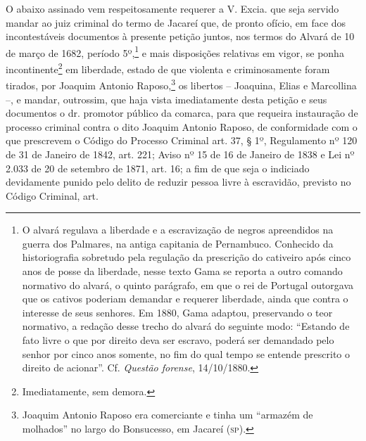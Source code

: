 O abaixo assinado vem respeitosamente requerer a V. Excia. que seja
servido mandar ao juiz criminal do termo de Jacareí que, de pronto
ofício, em face dos incontestáveis documentos à presente petição juntos,
nos termos do Alvará de 10 de março de 1682, período 5º,\footnote{ O
  alvará regulava a liberdade e a escravização de negros apreendidos na
  guerra dos Palmares, na antiga capitania de Pernambuco. Conhecido da
  historiografia sobretudo pela regulação da prescrição do cativeiro
  após cinco anos de posse da liberdade, nesse texto Gama se reporta a
  outro comando normativo do alvará, o quinto parágrafo, em que o rei de
  Portugal outorgava que os cativos poderiam demandar e requerer
  liberdade, ainda que contra o interesse de seus senhores. Em 1880,
  Gama adaptou, preservando o teor normativo, a redação desse trecho do
  alvará do seguinte modo: ``Estando de fato livre o que por direito deva
  ser escravo, poderá ser demandado pelo senhor por cinco anos somente,
  no fim do qual tempo se entende prescrito o direito de acionar''. Cf.
  \emph{Questão forense}, 14/10/1880.} e mais disposições relativas em
vigor, se ponha incontinente\footnote{ Imediatamente, sem demora.} em
liberdade, estado de que violenta e criminosamente foram tirados, por
Joaquim Antonio Raposo,\footnote{ Joaquim Antonio Raposo era
  comerciante e tinha um ``armazém de molhados'' no largo do Bonsucesso,
  em Jacareí (\textsc{sp}).} os libertos -- Joaquina, Elias e Marcollina --, e
mandar, outrossim, que haja vista imediatamente desta petição e seus
documentos o dr. promotor público da comarca, para que requeira
instauração de processo criminal contra o dito Joaquim Antonio Raposo,
de conformidade com o que prescrevem o Código do Processo Criminal art.
37, § 1º, Regulamento nº 120 de 31 de Janeiro de 1842, art. 221; Aviso
nº 15 de 16 de Janeiro de 1838 e Lei nº 2.033 de 20 de setembro de 1871,
art. 16; a fim de que seja o indiciado devidamente punido pelo delito de
reduzir pessoa livre à escravidão, previsto no Código Criminal, art.
